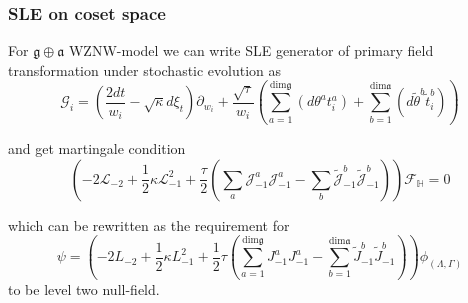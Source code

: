 \documentclass[pdftex]{beamer}
\newcommand{\gf}{\mathfrak{g}}
\newcommand{\af}{\mathfrak{a}}
\theoremstyle{definition} \newtheorem{Def}{Definition}
\begin{document}
\begin{frame}
  \frametitle{SLE on coset space}
  For  $\gf\oplus \af$ WZNW-model we can write SLE generator of primary field transformation under stochastic evolution as
  \begin{equation*}
    \mathcal{G}_{i}=\left(\frac{2dt}{w_{i}}-\sqrt{\kappa} d\xi_{t}\right) \partial_{w_{i}}+\frac{\sqrt{\tau}}{w_{i}}\left(\sum_{a=1}^{\mathrm{dim} \gf}\left(d \theta ^{a} t^{a}_{i}\right)+\sum_{b=1}^{\mathrm{dim} \af}\left(d \tilde{\theta} ^{b} \tilde{t}^{b}_{i}\right)\right)
  \end{equation*}

and get martingale condition
  \begin{equation*}
    \left(-2 \mathcal{L}_{-2}+\frac{1}{2}\kappa \mathcal{L}_{-1}^{2}+\frac{\tau}{2}\left( \sum_{a} \mathcal{J}^{a}_{-1} \mathcal{J}^{a}_{-1}-
        \sum_{b}\tilde{\mathcal{J}}^{b}_{-1} \tilde{\mathcal{J}}^{b}_{-1}\right)\right)        \mathcal{F}_{\mathbb{H}}=0
  \end{equation*}

which can be rewritten as the requirement for
\begin{equation*}
  \psi=\left(-2L_{-2}+\frac{1}{2}\kappa L_{-1}^{2}+\frac{1}{2}\tau \left(\sum_{a=1}^{\mathrm{dim}\gf}J^{a}_{-1}J^{a}_{-1}-\sum_{b=1}^{\mathrm{dim}\af}\tilde{J}^{b}_{-1}\tilde{J}^{b}_{-1}\right)\right) \phi_{(\Lambda,\Gamma)}
\end{equation*}
to be level two null-field.
\end{frame}
\end{document}
